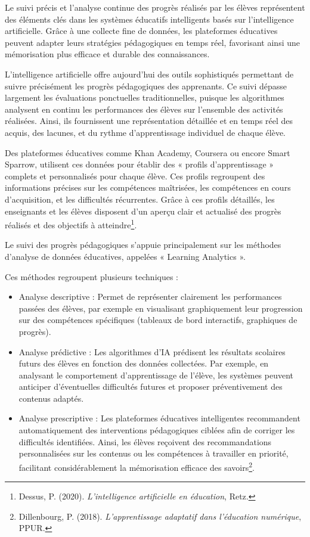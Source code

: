 \documentclass[11pt,a4paper]{report}
\begin{document}
Le suivi précis et l’analyse continue des progrès réalisés par les élèves représentent des éléments clés dans les systèmes éducatifs intelligents basés sur l’intelligence artificielle. Grâce à une collecte fine de données, les plateformes éducatives peuvent adapter leurs stratégies pédagogiques en temps réel, favorisant ainsi une mémorisation plus efficace et durable des connaissances.

L’intelligence artificielle offre aujourd’hui des outils sophistiqués permettant de suivre précisément les progrès pédagogiques des apprenants. Ce suivi dépasse largement les évaluations ponctuelles traditionnelles, puisque les algorithmes analysent en continu les performances des élèves sur l’ensemble des activités réalisées. Ainsi, ils fournissent une représentation détaillée et en temps réel des acquis, des lacunes, et du rythme d’apprentissage individuel de chaque élève.

Des plateformes éducatives comme Khan Academy, Coursera ou encore Smart Sparrow, utilisent ces données pour établir des « profils d’apprentissage » complets et personnalisés pour chaque élève. Ces profils regroupent des informations précises sur les compétences maîtrisées, les compétences en cours d’acquisition, et les difficultés récurrentes. Grâce à ces profils détaillés, les enseignants et les élèves disposent d’un aperçu clair et actualisé des progrès réalisés et des objectifs à atteindre\footnote{Dessus, P. (2020). \textit{L’intelligence artificielle en éducation}, Retz.}.

Le suivi des progrès pédagogiques s’appuie principalement sur les méthodes d’analyse de données éducatives, appelées « Learning Analytics ». 

Ces méthodes regroupent plusieurs techniques :
\begin{itemize}

    \item Analyse descriptive : Permet de représenter clairement les performances passées des élèves, par exemple en visualisant graphiquement leur progression sur des compétences spécifiques (tableaux de bord interactifs, graphiques de progrès).

    \item Analyse prédictive : Les algorithmes d’IA prédisent les résultats scolaires futurs des élèves en fonction des données collectées. Par exemple, en analysant le comportement d’apprentissage de l’élève, les systèmes peuvent anticiper d’éventuelles difficultés futures et proposer préventivement des contenus adaptés.

    \item Analyse prescriptive : Les plateformes éducatives intelligentes recommandent automatiquement des interventions pédagogiques ciblées afin de corriger les difficultés identifiées. Ainsi, les élèves reçoivent des recommandations personnalisées sur les contenus ou les compétences à travailler en priorité, facilitant considérablement la mémorisation efficace des savoirs\footnote{Dillenbourg, P. (2018). \textit{L’apprentissage adaptatif dans l’éducation numérique}, PPUR.}.

\end{itemize}
\end{document}
